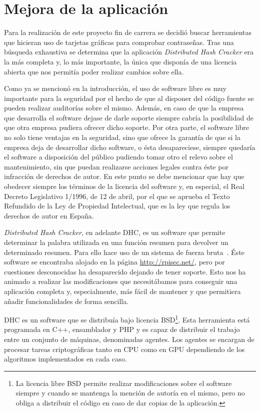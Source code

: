 \chapter{Mejora de la aplicación}\label{cap:mejoras}

Para la realización de este proyecto fin de carrera se decidió buscar herramientas que hicieran uso de tarjetas gráficas para comprobar contraseñas. Tras una búsqueda exhaustiva se determina que la aplicación \emph{Distributed Hash Cracker} era la más completa y, lo más importante, la única que disponía de una licencia abierta que nos permitía poder realizar cambios sobre ella.

Como ya se mencionó en la introducción, el uso de software libre es muy importante para la seguridad por el hecho de que al disponer del código fuente se pueden realizar auditorías sobre el mismo. Además, en caso de que la empresa que desarrolla el software dejase de darle soporte siempre cabría la posibilidad de que otra empresa pudiera ofrecer dicho soporte. Por otra parte, el software libre no solo tiene ventajas en la seguridad, sino que ofrece la garantía de que si la empresa deja de desarrollar dicho software, o ésta desapareciese, siempre quedaría el software a disposición del público pudiendo tomar otro el relevo sobre el mantenimiento, sin que puedan realizarse acciones legales contra éste por infracción de derechos de autor. En este punto se debe mencionar que hay que obedecer siempre los términos de la licencia del software y, en especial, el Real Decreto Legislativo 1/1996, de 12 de abril, por el que se aprueba el Texto Refundido de la Ley de Propiedad Intelectual, que es la ley que regula los derechos de autor en España.

\emph{Distributed Hash Cracker}, en adelante DHC, es un software que permite determinar la palabra utilizada en una función resumen para devolver un determinado resumen. Para ello hace uso de un sistema de fuerza bruta~\cite{dhc:paper}. Éste software se encontraba alojado en la página \url{http://rpisec.net/}, pero por cuestiones desconocidas ha desaparecido dejando de tener soporte. Esto nos ha animado a realizar las modificaciones que necesitábamos para conseguir una aplicación completa y, especialmente, más fácil de mantener y que permitiera añadir funcionalidades de forma sencilla.

DHC es un software que se distribuía bajo licencia BSD\footnote{La licencia libre BSD permite realizar modificaciones sobre el software siempre y cuando se mantenga la mención de autoría en el mismo, pero no obliga a distribuir el código en caso de dar copias de la aplicación.}. Esta herramienta está programada en C++, ensamblador y PHP y es capaz de distribuir el trabajo entre un conjunto de máquinas, denominadas agentes. Los agentes se encargan de procesar tareas criptográficas tanto en CPU como en GPU dependiendo de los algoritmos implementados en cada caso.

